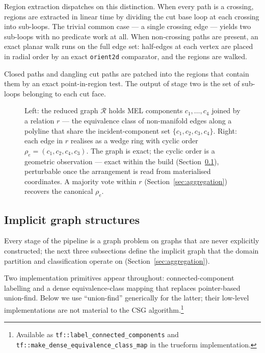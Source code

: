 \documentclass{egpubl}
\begin{document}
Region extraction dispatches on this distinction. When every path is a crossing, regions are extracted in linear time by dividing the cut base loop at each crossing into sub-loops. The trivial common case --- a single crossing edge --- yields two sub-loops with no predicate work at all. When non-crossing paths are present, an exact planar walk runs on the full edge set: half-edges at each vertex are placed in radial order by an exact \texttt{orient2d} comparator, and the regions are walked.

Closed paths and dangling cut paths are patched into the regions that contain them by an exact point-in-region test. The output of stage two is the set of sub-loops belonging to each cut face.

\begin{figure}[t]
  \centering
  
  \caption{
    Left: the reduced graph $\mathcal{R}$ holds MEL components
    $c_1, \ldots, c_4$ joined by a relation $r$ --- the equivalence class
    of non-manifold edges along a polyline that share the incident-component
    set $\{c_1, c_2, c_3, c_4\}$. Right: each edge in $r$ realises as
    a wedge ring with cyclic order $\rho_e = (c_1, c_2, c_4, c_3)$. The
    graph is exact; the cyclic order is a geometric observation ---
    exact within the build (Section~\ref{sec:graphs}), perturbable once
    the arrangement is read from materialised coordinates. A majority vote
    within $r$ (Section~\ref{sec:aggregation}) recovers the canonical $\rho_e$.
  }
  \label{fig:reduced_graph}
\end{figure}
\subsection{Implicit graph structures}
\label{sec:graphs}

Every stage of the pipeline is a graph problem on graphs that are never explicitly constructed; the next three subsections define the implicit graph that the domain partition and classification operate on (Section~\ref{sec:aggregation}).

Two implementation primitives appear throughout: connected-component labelling and a dense equivalence-class mapping that replaces pointer-based union-find. Below we use ``union-find'' generically for the latter; their low-level implementations are not material to the CSG algorithm.\footnote{Available as \texttt{tf::label\_connected\_components} and \texttt{tf::make\_dense\_equivalence\_class\_map} in the trueform implementation.}
\end{document}
